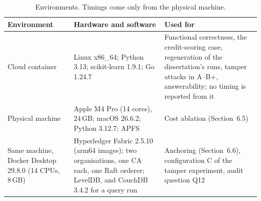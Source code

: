 \begin{table}[t]
\caption{Environments. Timings come only from the physical machine.}
\label{tab:env}
\footnotesize
\begin{tabularx}{\textwidth}{@{}>{\raggedright\arraybackslash}p{}LL@{}}
\toprule
Environment & Hardware and software & Used for \\
\midrule
Cloud container & Linux x86\_64; Python 3.13; scikit-learn 1.9.1; Go 1.24.7 & Functional correctness, the credit-scoring case, regeneration of the dissertation's runs, tamper attacks in A--B+, answerability; no timing is reported from it \\
Physical machine & Apple M4 Pro (14 cores), 24\,GB; macOS 26.6.2; Python 3.12.7; APFS & Cost ablation (Section~6.5) \\
Same machine, Docker Desktop 29.8.0 (14 CPUs, 8\,GB) & Hyperledger Fabric 2.5.10 (arm64 images); two organisations, one CA each, one Raft orderer; LevelDB, and CouchDB 3.4.2 for a query run & Anchoring (Section~6.6), configuration C of the tamper experiment, audit question Q12 \\
\bottomrule
\end{tabularx}
\end{table}
